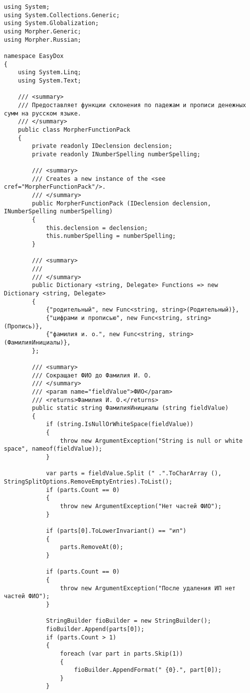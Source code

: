 \begin{lstlisting}
using System;
using System.Collections.Generic;
using System.Globalization;
using Morpher.Generic;
using Morpher.Russian;

namespace EasyDox
{
    using System.Linq;
    using System.Text;

    /// <summary>
    /// Предоставляет функции склонения по падежам и прописи денежных сумм на русском языке.
    /// </summary>
    public class MorpherFunctionPack
    {
        private readonly IDeclension declension;
        private readonly INumberSpelling numberSpelling;

        /// <summary>
        /// Creates a new instance of the <see cref="MorpherFunctionPack"/>.
        /// </summary>
        public MorpherFunctionPack (IDeclension declension, INumberSpelling numberSpelling)
        {
            this.declension = declension;
            this.numberSpelling = numberSpelling;
        }

        /// <summary>
        /// 
        /// </summary>
        public Dictionary <string, Delegate> Functions => new Dictionary <string, Delegate>
        {
            {"родительный", new Func<string, string>(Родительный)},
            {"цифрами и прописью", new Func<string, string> (Пропись)},
            {"фамилия и. о.", new Func<string, string> (ФамилияИнициалы)},
        };

        /// <summary>
        /// Сокращает ФИО до Фамилия И. О.
        /// </summary>
        /// <param name="fieldValue">ФИО</param>
        /// <returns>Фамилия И. О.</returns>
        public static string ФамилияИнициалы (string fieldValue)
        {
            if (string.IsNullOrWhiteSpace(fieldValue))
            {
                throw new ArgumentException("String is null or white space", nameof(fieldValue));
            }

            var parts = fieldValue.Split (" .".ToCharArray (), StringSplitOptions.RemoveEmptyEntries).ToList();
            if (parts.Count == 0)
            {
                throw new ArgumentException("Нет частей ФИО");
            }

            if (parts[0].ToLowerInvariant() == "ип")
            {
                parts.RemoveAt(0);
            }

            if (parts.Count == 0)
            {
                throw new ArgumentException("После удаления ИП нет частей ФИО");
            }

            StringBuilder fioBuilder = new StringBuilder();
            fioBuilder.Append(parts[0]);
            if (parts.Count > 1)
            {
                foreach (var part in parts.Skip(1))
                {
                    fioBuilder.AppendFormat(" {0}.", part[0]);
                }
            }


\end{lstlisting}
